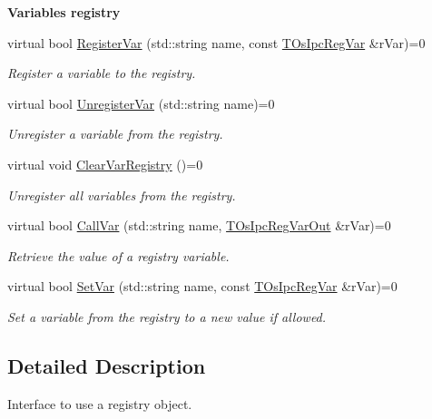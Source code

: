 \begin{Indent}\textbf{ Variables registry}\par
\begin{DoxyCompactItemize}
\item 
virtual bool \hyperlink{classIOsIpcRegistry_a754f5c04c6b8980d072517ef22a85613}{Register\+Var} (std\+::string name, const \hyperlink{structTOsIpcRegVar}{T\+Os\+Ipc\+Reg\+Var} \&r\+Var)=0
\begin{DoxyCompactList}\small\item\em Register a variable to the registry. \end{DoxyCompactList}\item 
virtual bool \hyperlink{classIOsIpcRegistry_ac34e3769178b6f9c05e57334045ffe18}{Unregister\+Var} (std\+::string name)=0
\begin{DoxyCompactList}\small\item\em Unregister a variable from the registry. \end{DoxyCompactList}\item 
virtual void \hyperlink{classIOsIpcRegistry_ac84f55f0f6f5469e6333270c17a8450c}{Clear\+Var\+Registry} ()=0
\begin{DoxyCompactList}\small\item\em Unregister all variables from the registry. \end{DoxyCompactList}\item 
virtual bool \hyperlink{classIOsIpcRegistry_a9e912067bedaecd35cf5ca8dbea54f12}{Call\+Var} (std\+::string name, \hyperlink{structTOsIpcRegVarOut}{T\+Os\+Ipc\+Reg\+Var\+Out} \&r\+Var)=0
\begin{DoxyCompactList}\small\item\em Retrieve the value of a registry variable. \end{DoxyCompactList}\item 
virtual bool \hyperlink{classIOsIpcRegistry_a5588474e7ba19e8cc8c29a0c6f295d42}{Set\+Var} (std\+::string name, const \hyperlink{structTOsIpcRegVar}{T\+Os\+Ipc\+Reg\+Var} \&r\+Var)=0
\begin{DoxyCompactList}\small\item\em Set a variable from the registry to a new value if allowed. \end{DoxyCompactList}\end{DoxyCompactItemize}
\end{Indent}


\subsection{Detailed Description}
Interface to use a registry object. 

